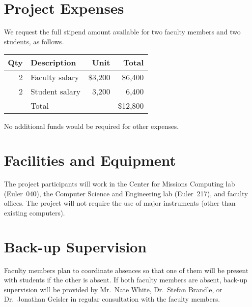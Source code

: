 \documentclass{article}
\begin{document}
\section{Project Expenses}
\label{sec:project-expenses}



We request the full stipend amount available for
two faculty members
and two students, as follows.

\begin{center}
  \begin{tabular}{rlrr} \toprule
    Qty & Description    & Unit    & Total    \\ \midrule
    2   & Faculty salary & \$3,200 & \$6,400  \\
    2   & Student salary & 3,200   & 6,400    \\ \midrule
        & Total          &         & \$12,800 \\ \bottomrule
  \end{tabular}
\end{center}

No additional funds would be required for other expenses.

\section{Facilities and Equipment}
\label{sec:facilities-equipment}


The project participants will work in
the Center for Missions Computing lab (Euler~040),
the Computer Science and Engineering lab (Euler~217), and
faculty offices.
The project will not require the use of major instruments
(other than existing computers).

\section{Back-up Supervision}
\label{sec:back-up-supervision}


Faculty members plan to coordinate absences
so that one of them will be present with students if the other is absent.
If both faculty members are absent,
back-up supervision will be provided by
Mr.\ Nate White,
Dr.\ Stefan Brandle, or
Dr.\ Jonathan Geisler
in regular consultation with the faculty members.
\end{document}
